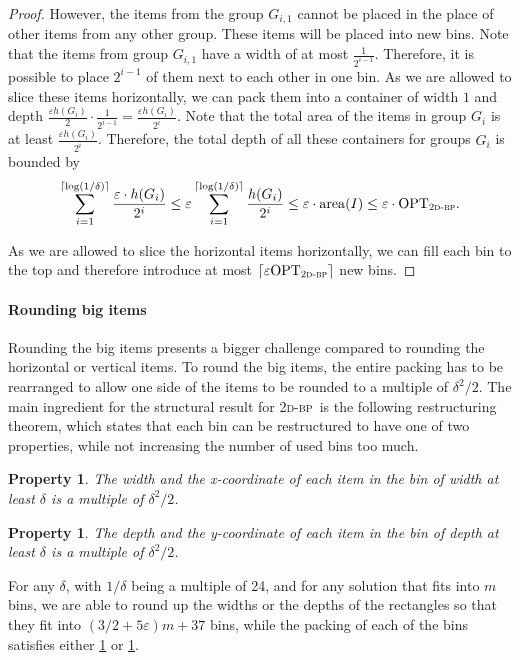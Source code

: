 \documentclass[a4paper,UKenglish,cleveref, autoref, thm-restate]{lipics-v2021}
\newcommand{\eps}{\varepsilon}
\newcommand{\opt}{\mathrm{OPT}}
\newcommand{\twobp}{\textsc{2d-bp}\xspace}
\newcommand{\bigy}{big\xspace}
\newtheorem{property}[theorem]{Property}
\newcommand{\area}{\mathrm{area}}
\begin{document}
\begin{proof}
However, the items from the group $G_{i,1}$ cannot be placed in the place of other items from any other group. 
These items will be placed into new bins.
Note that the items from group $G_{i,1}$ have a width of at most $\frac{1}{2^{i-1}}$.
Therefore, it is possible to place $2^{i-1}$ of them next to each other in one bin.
As we are allowed to slice these items horizontally, we can pack them into a container of width $1$ and depth $\frac{\eps h(G_i)}{2} \cdot \frac{1}{2^{i-1}} = \frac{\eps h(G_i)}{2^{i}}$.
Note that the total area of the items in group $G_i$  is at least $\frac{\eps h(G_i)}{2^{i}}$.
Therefore, the total depth of all these containers for groups $G_i$ is bounded by 
\[\sum_{i = 1}^{\lceil\log(1/\delta)\rceil} \frac{\eps \cdot h(G_i)}{2^{i}} \leq \eps \sum_{i = 1}^{\lceil\log(1/\delta)\rceil} \frac{h(G_i)}{2^{i}}\leq \eps \cdot \area(I) \leq \eps \cdot \opt_{\twobp}.\]

As we are allowed to slice the horizontal items horizontally, we can fill each bin to the top and therefore introduce at most $\lceil \eps \opt_{\twobp}\rceil$ new bins.
\end{proof}

\paragraph*{Rounding \bigy items}
Rounding the \bigy items presents a bigger challenge compared to rounding the horizontal or vertical items.
To round the \bigy items, the entire packing has to be rearranged to allow one side of the items to be rounded to a multiple of $\delta^2/2$.
The main ingredient for the structural result for \twobp~is the following restructuring theorem, which states that each bin can be restructured to have one of two properties, while not increasing the number of used bins too much.

\begin{property}
\label{prop1}
The width and the x-coordinate of each item in the bin of width at least $\delta$ is a multiple of $\delta^2/2$.
\end{property}

\begin{property}
\label{prop2}
The depth and the y-coordinate of each item in the bin of depth at least $\delta$ is a multiple of $\delta^2/2$.
\end{property}
\begin{theorem}
\label{thm:2d-bin-packing-repacking-structure}
    For any $\delta$, with $1/\delta$ being a multiple of 24, and for any solution that fits into $m$ bins, we are able to round up the widths or the depths of the rectangles so that they ﬁt into $(3/2 +5\eps)m +37$ bins, while the packing of each of the bins satisfies either \cref{prop1} or \cref{prop2}.
\end{theorem}
\end{document}
